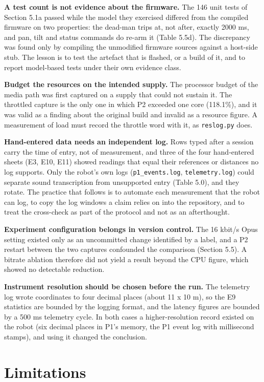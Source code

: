 \textbf{A test count is not evidence about the firmware.} The 146 unit tests of Section 5.1a passed while the model they exercised differed from the compiled firmware on two properties: the dead-man trips at, not after, exactly 2000 ms, and pan, tilt and status commands do re-arm it (Table 5.5d). The discrepancy was found only by compiling the unmodified firmware sources against a host-side stub. The lesson is to test the artefact that is flashed, or a build of it, and to report model-based tests under their own evidence class.

\textbf{Budget the resources on the intended supply.} The processor budget of the media path was first captured on a supply that could not sustain it. The throttled capture is the only one in which P2 exceeded one core (118.1\%), and it was valid as a finding about the original build and invalid as a resource figure. A measurement of load must record the throttle word with it, as \texttt{reslog.py} does.

\textbf{Hand-entered data needs an independent log.} Rows typed after a session carry the time of entry, not of measurement, and three of the four hand-entered sheets (E3, E10, E11) showed readings that equal their references or distances no log supports. Only the robot's own logs (\texttt{p1\_events.log}, \texttt{telemetry.log}) could separate sound transcription from unsupported entry (Table 5.0), and they rotate. The practice that follows is to automate each measurement that the robot can log, to copy the log windows a claim relies on into the repository, and to treat the cross-check as part of the protocol and not as an afterthought.

\textbf{Experiment configuration belongs in version control.} The 16 kbit/s Opus setting existed only as an uncommitted change identified by a label, and a P2 restart between the two captures confounded the comparison (Section 5.5). A bitrate ablation therefore did not yield a result beyond the CPU figure, which showed no detectable reduction.

\textbf{Instrument resolution should be chosen before the run.} The telemetry log wrote coordinates to four decimal places (about 11 x 10 m), so the E9 statistics are bounded by the logging format, and the latency figures are bounded by a 500 ms telemetry cycle. In both cases a higher-resolution record existed on the robot (six decimal places in P1's memory, the P1 event log with millisecond stamps), and using it changed the conclusion.

\section{Limitations}

